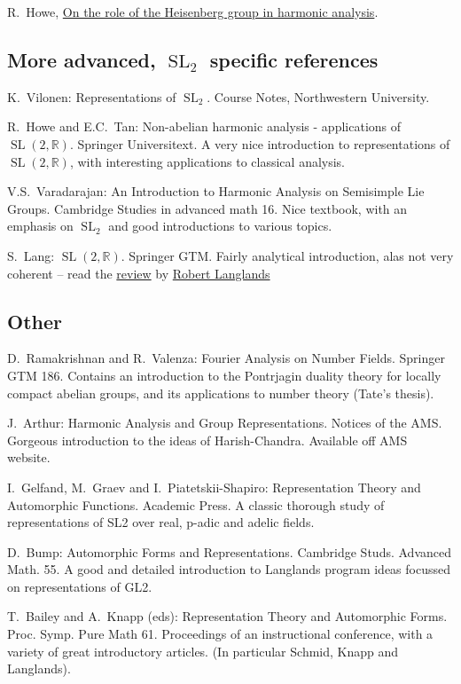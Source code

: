 \documentclass[11pt,leqno]{article}
\theoremstyle{plain}
\theoremstyle{definition}
\numberwithin{equation}{section}
\numberwithin{lem}{section}
\DeclareMathOperator{\SL}{SL}
\begin{document}
{R.~Howe, \href{https://utexas.instructure.com/courses/1428938/files/86306747?wrap=1}{On the role of the Heisenberg group in harmonic analysis}.
\subsection*{\hspace{1em}More advanced, $\SL_2$ specific references}
K.~Vilonen: Representations of $\SL_2$. Course Notes, Northwestern University.

R.~Howe and E.C.~Tan: Non-abelian harmonic analysis - applications of $\SL(2,\mathbb R)$. Springer Universitext. A very nice introduction to representations of $\SL(2,\mathbb R)$, with interesting applications to classical analysis.

V.S.~Varadarajan: An Introduction to Harmonic Analysis on Semisimple Lie Groups. Cambridge Studies in advanced math 16. Nice textbook, with an emphasis on $\SL_2$ and good introductions to various topics.

S.~Lang: $\SL(2,\mathbb R)$. Springer GTM. Fairly analytical introduction, alas not very coherent -- read the \href{http://www.sunsite.ubc.ca/DigitalMathArchive/Langlands/miscellaneous.html#lang}{review} by \href{http://www.sunsite.ubc.ca/DigitalMathArchive/Langlands}{Robert Langlands}
\subsection*{\hspace{1em}Other}
D.~Ramakrishnan and R.~Valenza: Fourier Analysis on Number Fields. Springer GTM 186. Contains an introduction to the Pontrjagin duality theory for locally compact abelian groups, and its applications to number theory (Tate's thesis).

J.~Arthur: Harmonic Analysis and Group Representations. Notices of the AMS. Gorgeous introduction to the ideas of Harish-Chandra. Available off AMS website.

I.~Gelfand, M.~Graev and I.~Piatetskii-Shapiro: Representation Theory and Automorphic Functions. Academic Press. A classic thorough study of representations of SL2 over real, p-adic and adelic fields.

D.~Bump: Automorphic Forms and Representations. Cambridge Studs. Advanced Math. 55. A good and detailed introduction to Langlands program ideas focussed on representations of GL2.

T.~Bailey and A.~Knapp (eds): Representation Theory and Automorphic Forms. Proc. Symp. Pure Math 61. Proceedings of an instructional conference, with a variety of great introductory articles. (In particular Schmid, Knapp and Langlands).

}
\end{document}
